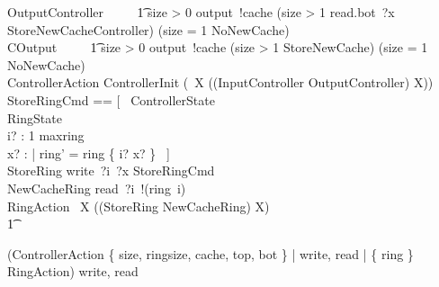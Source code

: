 \begin{circus}
    OutputController ~~\circdef~~
            \t1 \lcircguard size > 0 \rcircguard \circguard output~!cache \then
            (\lcircguard size > 1 \rcircguard \circguard read.bot~?x \then StoreNewCacheController)
            \extchoice
            (\lcircguard size = 1 \rcircguard \circguard NoNewCache) \\
    COutput ~~\circdef~~
            \t1 \lcircguard size > 0 \rcircguard \circguard output~!cache \then
            (\lcircguard size > 1 \rcircguard \circguard StoreNewCache)
            \extchoice
            (\lcircguard size = 1 \rcircguard \circguard NoNewCache) \\


    ControllerAction \circdef ControllerInit \circseq (\circmu\ X \circspot ((InputController \extchoice OutputController) \circseq X)) \\

    StoreRingCmd == [~
            \Xi ControllerState
            \\%
            \Delta RingState
            \\%
            i? : 1 \upto maxring
            \\%
            x? : \nat
        |
            ring' = ring \oplus \{ i? \mapsto x? \} ~] \\

   StoreRing \circdef write~?i~?x \then StoreRingCmd \\
   NewCacheRing \circdef read~?i~!(ring~i) \then \Skip \\

   RingAction \circdef \circmu\ X \circspot ((StoreRing \extchoice NewCacheRing) \circseq X) \\
    \t1 \circspot

   (ControllerAction \lpar
        \{ size, ringsize, cache, top, bot \} |
        \lchanset write, read \rchanset |
        \{ ring \} \rpar
    RingAction) \circhide \lchanset write, read \rchanset \\
    \circend
\end{circus}
